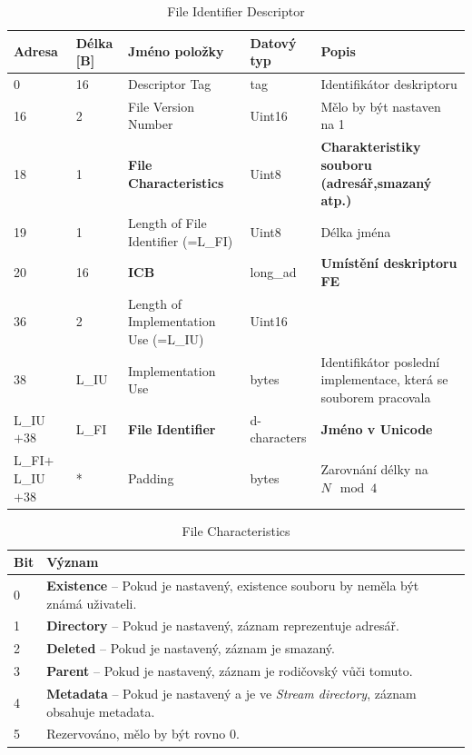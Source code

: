 \begin{table}[]
    \centering
    \begin{tabular}{ | l | l | p{3.7cm} | p{1.8cm} | p{4.2cm} | }
        \hline
        Adresa  & Délka [B]   & Jméno položky & Datový typ    & Popis \\ \hline\hline
        0   &16               & Descriptor Tag                    & tag           & Identifikátor deskriptoru \\ \hline
        16  &2                & File Version Number               & Uint16        & Mělo by být nastaven na 1 \\ \hline
        18  &1                & \textbf{File Characteristics}     & Uint8         & \textbf{Charakteristiky souboru (adresář,smazaný atp.)} \\ \hline
        19  &1                & Length of File Identifier (=L\_FI)& Uint8         & Délka jména \\ \hline
        20  &16               & \textbf{ICB}                      & long\_ad      & \textbf{Umístění deskriptoru FE} \\ \hline
        36  &2                & Length of Implementation Use (=L\_IU)& Uint16     &  \\ \hline
        38  &L\_IU            & Implementation Use                & bytes         & Identifikátor poslední implementace, která se souborem pracovala \\ \hline
        L\_IU$+38$&L\_FI      & \textbf{File Identifier}          & d-characters  & \textbf{Jméno v Unicode} \\ \hline
        L\_FI$+$L\_IU$+38$&*  & Padding                           & bytes         & Zarovnání délky na $N \mod 4$ \\ \hline
    \end{tabular}
    \caption{File Identifier Descriptor\label{tab:fid}}
\end{table}
\begin{table}
    \centering
    \begin{tabular}{ | l | l |}
        \hline
        Bit & Význam \\ \hline\hline
        0   & \textbf{Existence} -- Pokud je nastavený, existence souboru by neměla být známá uživateli.\\\hline
        1   & \textbf{Directory} -- Pokud je nastavený, záznam reprezentuje adresář.\\\hline
        2   & \textbf{Deleted} -- Pokud je nastavený, záznam je smazaný.\\\hline
        3   & \textbf{Parent} -- Pokud je nastavený, záznam je rodičovský vůči tomuto.\\\hline
        4   & \textbf{Metadata} -- Pokud je nastavený a je ve \textit{Stream directory}, záznam obsahuje metadata.\\\hline
        5   & Rezervováno, mělo by být rovno 0.\\\hline
    \end{tabular}
    \caption{File Characteristics\label{tab:file-characteristics}}
\end{table}


